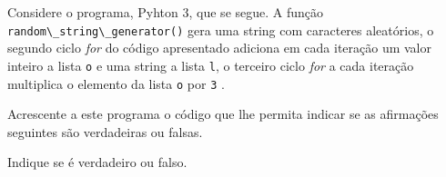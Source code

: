 \documentclass[12pt,varwidth=16cm,border=1pt]{standalone}
\begin{document}
Considere o programa, Pyhton 3, que se segue. A função \verb+random\_string\_generator()+ gera uma string com caracteres aleatórios, o segundo ciclo \textit{for} do código apresentado adiciona em cada iteração um valor inteiro a lista \verb+o+ e uma string a lista \verb+l+, o terceiro ciclo \textit{for} a cada iteração multiplica o elemento da lista \verb+o+ por \verb+3+ .



Acrescente a este programa o código que lhe permita indicar se as
afirmações seguintes são verdadeiras ou falsas.

Indique se é verdadeiro ou falso.
\end{document}
